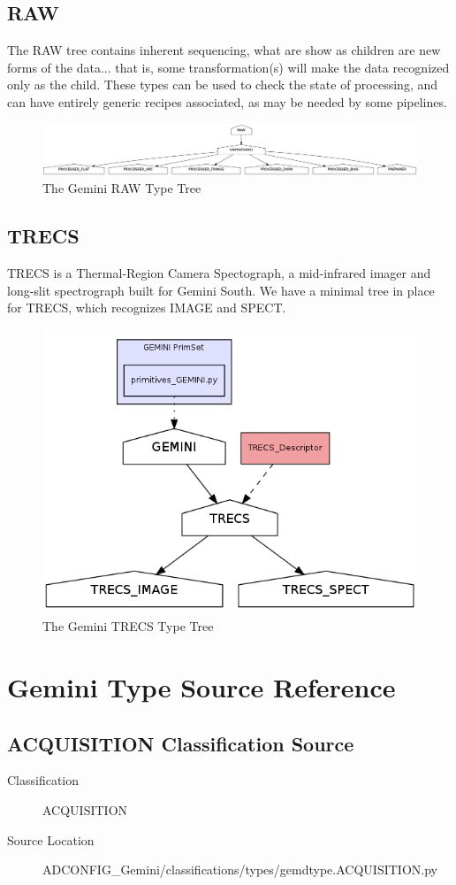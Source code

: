 \documentclass[letterpaper,10pt,english]{sphinxmanual}
\begin{document}
\section{RAW}
\label{appendix_typegraphs:raw}
The RAW tree contains inherent sequencing, what are show as children are new
forms of the data... that is, some transformation(s) will make the data
recognized only as the child.  These types can be used to check the state of
processing, and can have entirely generic recipes associated, as may be needed
by some pipelines.
\begin{figure}[htbp]
\centering
\capstart

\includegraphics[width=0.600\linewidth]{RAW-tree-pd.png}
\caption{The Gemini RAW Type Tree}\end{figure}


\section{TRECS}
\label{appendix_typegraphs:trecs}
TRECS is a Thermal-Region Camera Spectograph, a mid-infrared imager and
long-slit spectrograph built  for Gemini South. We have a minimal tree in place
for TRECS, which recognizes IMAGE and SPECT.
\begin{figure}[htbp]
\centering
\capstart

\includegraphics[width=0.300\linewidth]{TRECS-tree-pd.png}
\caption{The Gemini TRECS Type Tree}\end{figure}


\chapter{Gemini Type Source Reference}
\label{gen.typedefs/gen.TypeSourceAppendix:gemini-type-source-reference}\label{gen.typedefs/gen.TypeSourceAppendix::doc}

\section{ACQUISITION Classification Source}
\label{gen.typedefs/gen.gemdtype.ACQUISITION:acquisition-classification-source}\label{gen.typedefs/gen.gemdtype.ACQUISITION::doc}\begin{description}
\item[{Classification}] \leavevmode
ACQUISITION

\item[{Source Location}] \leavevmode
ADCONFIG\_Gemini/classifications/types/gemdtype.ACQUISITION.py

\end{description}
\end{document}
